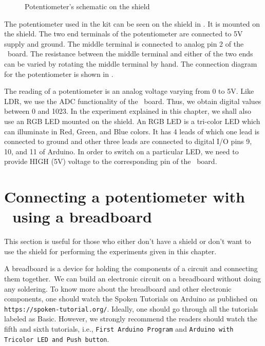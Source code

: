 \begin{figure}
\centering
{} \hfill
{}
\caption{Potentiometer's schematic on the shield}
\label{fig:potmeterconn}
\end{figure}

The potentiometer used in the kit can be seen on the shield in
.  It is
mounted on the shield. The two end terminals of the potentiometer are
connected to 5V supply and ground. The middle terminal is connected to
analog pin 2 of the \arduino\ board. The resistance between the middle
terminal and either of the two ends can be varied by rotating the
middle terminal by hand. The connection diagram for the potentiometer
is shown in .

The reading of a potentiometer is an analog voltage varying from 0 to
5V. Like LDR, we use the ADC functionality of the
\arduino\ board. Thus, we obtain digital values between 0 and 1023. 
In the experiment explained in this chapter, we shall also use an RGB
LED mounted on the shield. An RGB LED is a tri-color LED which can
illuminate in Red, Green, and Blue colors. It has 4 leads of which one
lead is connected to ground and other three leads are connected to
digital I/O pins 9, 10, and 11 of Arduino. In order to switch on a
particular LED, we need to provide HIGH (5V) voltage to the
corresponding pin of the \arduino\ board.

\section{Connecting a potentiometer with \arduino\ using a breadboard}
This section is useful for those who either don't have a shield or don't want to use the shield
for performing the experiments given in this chapter. 

A breadboard is a device for holding the components of a circuit and connecting 
them together. We can build an electronic circuit on a breadboard without doing any 
soldering. To know more about the breadboard and other electronic components, 
one should watch the Spoken Tutorials on Arduino as published on
{\tt https://spoken-tutorial.org/}. Ideally, one should go through all the
tutorials labeled as Basic. However, we strongly recommend the readers should
watch the fifth and sixth tutorials, i.e., {\tt First Arduino Program} and 
{\tt Arduino with Tricolor LED and Push button}.

